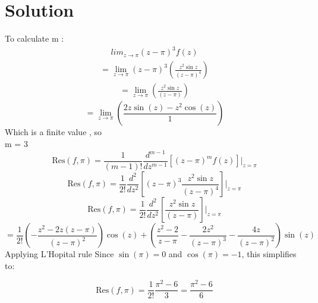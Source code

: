 \documentclass[journal,12pt,twocolumn]{IEEEtran}
\theoremstyle{remark}
\begin{document}
\section{Solution}

To calculate m :
\begin{align}
lim_{{z \to \pi}} (z-\pi)^3 f(z) 
\end{align}
\begin{align}
= \lim_{{z \to \pi}} (z-\pi)^3 \left( \frac{{ z^2 \sin z}}{{(z-\pi)^4}} \right)
\end{align}
\begin{align}
= \lim_{{z \to \pi}}  \left( \frac{{ z^2 \sin z}}{{(z-\pi)}} \right)
\end{align}
\begin{equation}
= \lim_{{z \to \pi}}  \left( \frac{2z \sin(z) - z^2 \cos(z)}{1} \right)
\end{equation}
Which is a finite value , so \\
m = 3
\begin{equation}
\text{Res}(f, \pi) = \frac{1}{(m-1)!} \frac{d^{m-1}}{dz^{m-1}} \left[ (z-\pi)^m f(z) \right] \Bigg|_{z=\pi}
\end{equation}
\begin{equation}
\text{Res}(f,\pi) = \frac{1}{2!} \frac{d^2}{dz^2} \left[ (z-\pi)^3 \frac{z^2 \sin z}{(z-\pi)^4} \right] \Bigg|_{z=\pi}
\end{equation}
\begin{equation}
\text{Res}(f,\pi) = \frac{1}{2!} \frac{d^2}{dz^2} \left[ \frac{z^2 \sin z}{(z-\pi)} \right] \Bigg|_{z=\pi}
\end{equation}
\begin{equation}
= \frac{1}{2!}\left(-\frac{z^2 - 2z(z-\pi)}{(z-\pi)^2}\right) \cos(z)+\left(\frac{z^2-2}{z-\pi}- \frac{2z^2}{(z-\pi)^3} - \frac{4z}{(z-\pi)^2}  \right) \sin(z)
\end{equation}
Applying L'Hopital rule
Since \( \sin(\pi) = 0 \) and \( \cos(\pi) = -1 \), this simplifies to:

\begin{equation}
\text{Res}(f,\pi) = \frac{1}{2!} \frac{\pi^2-6}{3} = \frac{\pi^2 - 6}{6} 
\end{equation}
\end{document}
